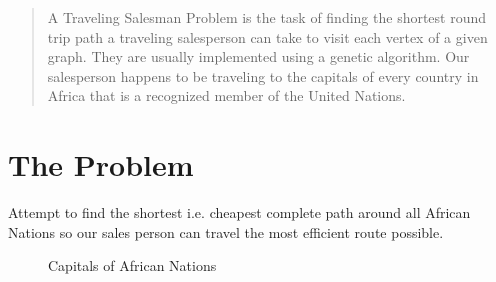 \documentclass[12pt]{article}
\begin{document}
\maketitle

\begin{abstract}
  A Traveling Salesman Problem is the task of finding
the shortest round trip path a traveling salesperson can take
to visit each vertex of a given graph.  They are usually
implemented using a genetic algorithm. Our salesperson
happens to be traveling to the capitals of every country in Africa that is a recognized member of the United Nations.
\end{abstract}

\section{The Problem}

  Attempt to find the shortest i.e. cheapest complete path around all African Nations so our sales person can travel the most efficient route possible.

\begin{figure}[h!]
  \begin{center}
    \setlength\fboxsep{1.00pt}
    \setlength\fboxrule{1.00pt}
    \caption{Capitals of African Nations}
  \end{center}
\end{figure}
\end{document}
